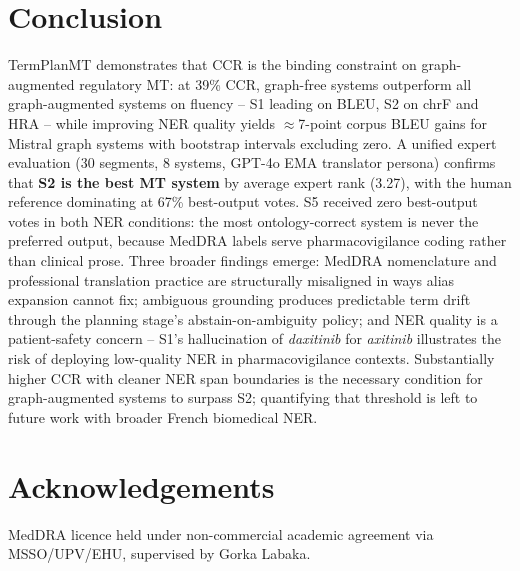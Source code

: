 \documentclass[11pt,a4paper,twocolumn]{article}
\begin{document}
\section{Conclusion}
\label{sec:conclusion}

TermPlanMT demonstrates that CCR is the binding constraint on
graph-augmented regulatory MT: at 39\% CCR, graph-free systems outperform
all graph-augmented systems on fluency -- S1 leading on BLEU, S2 on chrF and
HRA -- while improving NER quality yields $\approx$7-point corpus BLEU gains
for Mistral graph systems with bootstrap intervals excluding zero. A unified
expert evaluation (30 segments, 8 systems, GPT-4o EMA translator persona)
confirms that \textbf{S2 is the best MT system} by average expert rank (3.27),
with the human reference dominating at 67\% best-output votes. S5 received
zero best-output votes in both NER conditions: the most ontology-correct
system is never the preferred output, because MedDRA labels serve
pharmacovigilance coding rather than clinical prose. Three broader findings
emerge: MedDRA nomenclature and professional translation practice are
structurally misaligned in ways alias expansion cannot fix; ambiguous
grounding produces predictable term drift through the planning stage's
abstain-on-ambiguity policy; and NER quality is a patient-safety concern --
S1's hallucination of \textit{daxitinib} for \textit{axitinib} illustrates
the risk of deploying low-quality NER in pharmacovigilance contexts.
Substantially higher CCR with cleaner NER span boundaries is the necessary
condition for graph-augmented systems to surpass S2; quantifying that
threshold is left to future work with broader French biomedical NER.

\section*{Acknowledgements}
MedDRA licence held under non-commercial academic agreement
via MSSO/UPV/EHU, supervised by Gorka Labaka.



\end{document}

